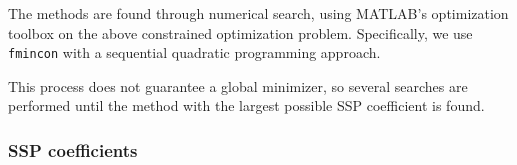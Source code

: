 The methods are found through numerical search, using %
\textsc{MATLAB}'s optimization toolbox on the above constrained
optimization problem.  Specifically, we use \verb"fmincon" with a
sequential quadratic programming approach.

This process does not guarantee a global minimizer, so several
searches are performed until the method with the largest possible SSP
coefficient is found.

\subsubsection{SSP coefficients}\label{subsection3.1.2}

